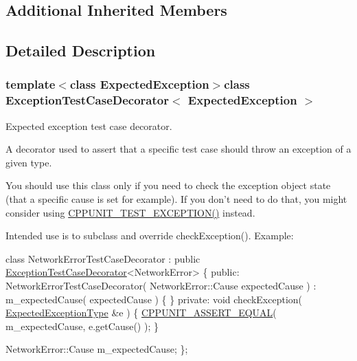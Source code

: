 \subsection*{Additional Inherited Members}


\subsection{Detailed Description}
\subsubsection*{template$<$class Expected\-Exception$>$class Exception\-Test\-Case\-Decorator$<$ Expected\-Exception $>$}

Expected exception test case decorator. 

A decorator used to assert that a specific test case should throw an exception of a given type.

You should use this class only if you need to check the exception object state (that a specific cause is set for example). If you don't need to do that, you might consider using \hyperlink{group___writing_test_fixture_gaca8eeb6f60714baade6cbfd185868c40}{C\-P\-P\-U\-N\-I\-T\-\_\-\-T\-E\-S\-T\-\_\-\-E\-X\-C\-E\-P\-T\-I\-O\-N()} instead.

Intended use is to subclass and override check\-Exception(). Example\-:


\begin{DoxyCode}
\textcolor{keyword}{class }NetworkErrorTestCaseDecorator : 
          \textcolor{keyword}{public} \hyperlink{class_exception_test_case_decorator}{ExceptionTestCaseDecorator}<NetworkError>
\{
\textcolor{keyword}{public}:
  NetworkErrorTestCaseDecorator( NetworkError::Cause expectedCause )
      : m\_expectedCause( expectedCause )
  \{
  \}
\textcolor{keyword}{private}:
  \textcolor{keywordtype}{void} checkException( \hyperlink{class_exception_test_case_decorator_a3fc7e11a4aa1730fa98ff6ac52958ae9}{ExpectedExceptionType} &e )
  \{
    \hyperlink{_test_assert_8h_a71162f05be07ef6817d156e77c68b1a3}{CPPUNIT\_ASSERT\_EQUAL}( m\_expectedCause, e.getCause() );
  \}

  NetworkError::Cause m\_expectedCause;
\};
\end{DoxyCode}
 

